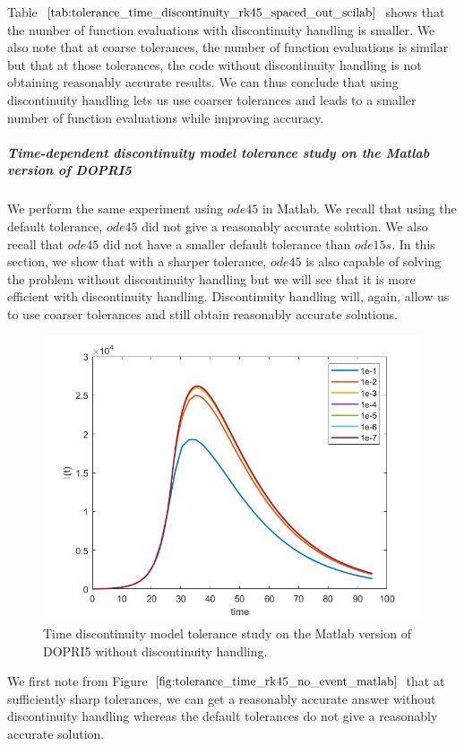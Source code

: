 Table $\ref{tab:tolerance_time_discontinuity_rk45_spaced_out_scilab}$ shows that the number of function evaluations with discontinuity handling is smaller. We also note that at coarse tolerances, the number of function evaluations is similar but that at those tolerances, the code without discontinuity handling is not obtaining reasonably accurate results. We can thus conclude that using discontinuity handling lets us use coarser tolerances and leads to a smaller number of function evaluations while improving accuracy.


\subparagraph{Time-dependent discontinuity model tolerance study on the Matlab version of DOPRI5}
We perform the same experiment using $ode45$ in Matlab. We recall that using the default tolerance, $ode45$ did not give a reasonably accurate solution. We also recall that $ode45$ did not have a smaller default tolerance than $ode15s$. In this section, we show that with a sharper tolerance, $ode45$ is also capable of solving the problem without discontinuity handling but we will see that it is more efficient with discontinuity handling. Discontinuity handling will, again, allow us to use coarser tolerances and still obtain reasonably accurate solutions.

\begin{figure}[H]
\centering
\includegraphics[width=0.7\linewidth]{./figures/tolerance_time_rk45_no_event_matlab}
\caption{Time discontinuity model tolerance study on the Matlab version of DOPRI5 without discontinuity handling.}
\label{fig:tolerance_time_rk45_no_event_matlab}
\end{figure}

We first note from Figure $\ref{fig:tolerance_time_rk45_no_event_matlab}$ that at sufficiently sharp tolerances, we can get a reasonably accurate answer without discontinuity handling whereas the default tolerances do not give a reasonably accurate solution.

